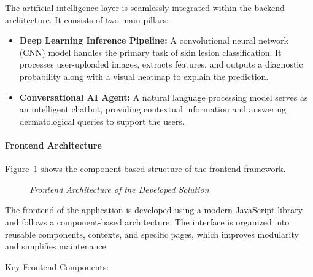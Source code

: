 The artificial intelligence layer is seamlessly integrated within the backend architecture. It consists of two main pillars:
\begin{itemize}
    \item \textbf{Deep Learning Inference Pipeline:} A convolutional neural network (CNN) model handles the primary task of skin lesion classification. It processes user-uploaded images, extracts features, and outputs a diagnostic probability along with a visual heatmap to explain the prediction.
    \item \textbf{Conversational AI Agent:} A natural language processing model serves as an intelligent chatbot, providing contextual information and answering dermatological queries to support the users.
\end{itemize}

\paragraph{Frontend Architecture}

Figure~\ref{fig:frontend_arch} shows the component-based structure of the frontend framework.

\begin{figure}[H]
	\centering
	\caption{\textit{Frontend Architecture of the Developed Solution}}
	\label{fig:frontend_arch}
\end{figure}

The frontend of the application is developed using a modern JavaScript library and follows a component-based architecture. The interface is organized into reusable components, contexts, and specific pages, which improves modularity and simplifies maintenance.

Key Frontend Components:

